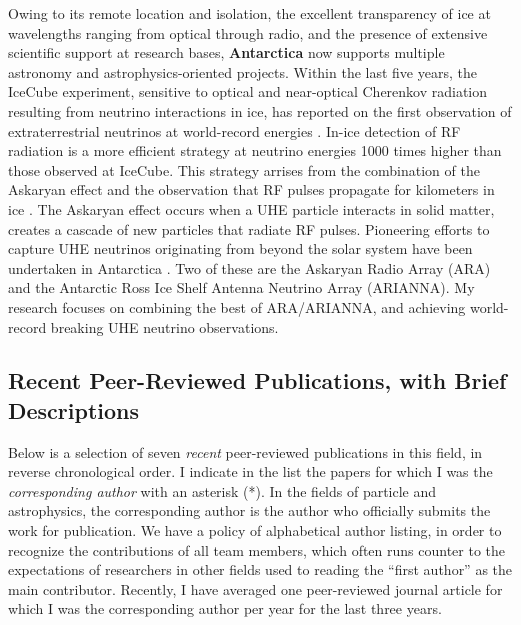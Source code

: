 \documentclass[../../main.tex]{subfiles}
\begin{document}
Owing to its remote location and isolation, the excellent transparency of ice at wavelengths ranging from optical through radio, and the presence of extensive scientific support at research bases, \textbf{Antarctica} now supports multiple astronomy and astrophysics-oriented projects.  Within the last five years,  the IceCube experiment, sensitive to optical and near-optical Cherenkov radiation resulting from neutrino interactions in ice, has reported on the first observation of extraterrestrial neutrinos at world-record energies \cite{Aartsen:2016xlq}.  In-ice detection of RF radiation is a more efficient strategy at neutrino energies 1000 times higher than those observed at IceCube. This strategy arrises from the combination of the Askaryan effect \cite{Askaryan:1962hbi,1962JPSJS..17C.257A,1965JETP...21..658A} and the observation that RF pulses propagate for kilometers in ice \cite{barrella_barwick_saltzberg_2011,barwick_besson_gorham_saltzberg_2005}.  The Askaryan effect occurs when a UHE particle interacts in solid matter, creates a cascade of new particles that radiate RF pulses.  Pioneering efforts to capture UHE neutrinos originating from beyond the solar system have been undertaken in Antarctica \cite{Allison:2015eky,Barwick:2014pca,Gorham:2008dv,Kravchenko:2001id}.  Two of these are the Askaryan Radio Array (ARA) and the Antarctic Ross Ice Shelf Antenna Neutrino Array (ARIANNA).  My research focuses on combining the best of ARA/ARIANNA, and achieving world-record breaking UHE neutrino observations.

\subsection{Recent Peer-Reviewed Publications, with Brief Descriptions}

Below is a selection of seven \textit{recent} peer-reviewed publications in this field, in reverse chronological order.  I indicate in the list the papers for which I was the  \textit{corresponding author} with an asterisk (*).  In the fields of particle and astrophysics, the corresponding author is the author who officially submits the work for publication.  We have a policy of alphabetical author listing, in order to recognize the contributions of all team members, which often runs counter to the expectations of researchers in other fields used to reading the ``first author'' as the main contributor.  Recently, I have averaged one peer-reviewed journal article for which I was the corresponding author per year for the last three years.
\end{document}
